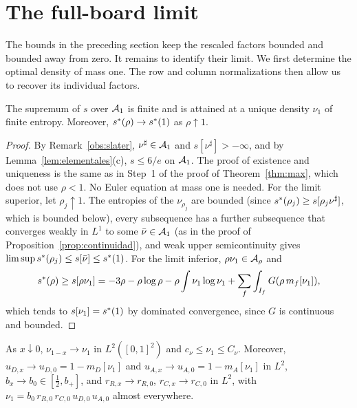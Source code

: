 \section{The full-board limit}\label{sec:limite}

The bounds in the preceding section keep the rescaled factors bounded and bounded away from zero. It remains to identify their limit.
We first determine the optimal density of mass one. The row and column normalizations then allow us to recover its individual factors.

\begin{proposicion}\label{prop:masa_uno} The supremum of $s$ over ${\mathcal{A}}_1$ is finite and is attained at a
unique density $\nu_1$ of finite entropy. Moreover, $s^{*}(\rho)\to s^{*}(1)$ as $\rho\uparrow1$. \end{proposicion}

\begin{proof} By Remark~\ref{obs:slater}, $\nu^\sharp\in{\mathcal{A}}_1$ and $s[\nu^\sharp]>-\infty$, and by Lemma~\ref{lem:elementales}(c),
$s\le6/e$ on ${\mathcal{A}}_1$. The proof of existence and uniqueness is the same as in Step~1 of the proof of Theorem~\ref{thm:max}, which does
not use $\rho<1$. No Euler equation at mass one is needed. For the limit superior, let $\rho_j\uparrow1$. The entropies of the
$\nu_{\rho_j}$ are bounded (since $s^{*}(\rho_j)\ge s[\rho_j\nu^\sharp]$, which is bounded below), every subsequence has a further
subsequence that converges weakly in $L^1$ to some $\bar\nu\in{\mathcal{A}}_1$ (as in the proof of Proposition~\ref{prop:continuidad}), and weak
upper semicontinuity gives $\limsup s^{*}(\rho_j)\le s[\bar\nu]\le s^{*}(1)$. For the limit inferior, $\rho\nu_1\in{\mathcal{A}}_\rho$ and \[
 s^{*}(\rho)\ge s[\rho\nu_1]=-3\rho-\rho\log\rho-\rho\int\nu_1\log\nu_1+\sum_f\int_{I_f}G(\rho\,m_f[\nu_1]),
\] which tends to $s[\nu_1]=s^{*}(1)$ by dominated convergence, since $G$ is continuous and bounded. \end{proof}

\begin{proposicion}[Convergence in $L^2$]\label{prop:conv_L2} As $x\downarrow0$, $\nu_{1-x}\to\nu_1$ in $L^2([0,1]^2)$ and
$c_\nu\le\nu_1\le C_\nu$. Moreover, $u_{D,x}\to u_{D,0}=1-m_D[\nu_1]$ and $u_{A,x}\to u_{A,0}=1-m_A[\nu_1]$ in $L^2$, $b_x\to
b_0\in[\frac12,b_+]$, and $r_{R,x}\to r_{R,0}$, $r_{C,x}\to r_{C,0}$ in $L^2$, with $\nu_1=b_0\,r_{R,0}\,r_{C,0}\,u_{D,0}\,u_{A,0}$
almost everywhere. \end{proposicion}

